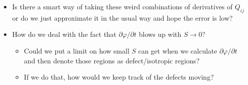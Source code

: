 \documentclass[reqno]{article}
\begin{document}
\begin{itemize}
		\item Is there a smart way of taking these weird combinations of derivatives of $Q_{ij}$ or do we just approximate it in the usual way and hope the error is low?
		
		\item How do we deal with the fact that $\partial \varphi/\partial t$ blows up with $S \to 0$?
		\begin{itemize}
			\item Could we put a limit on how small $S$ can get when we calculate $\partial \varphi/\partial t$ and then denote those regions as defect/isotropic regions? 
			\item If we do that, how would we keep track of the defects moving?
		\end{itemize}
	\end{itemize}
	
\end{document}
